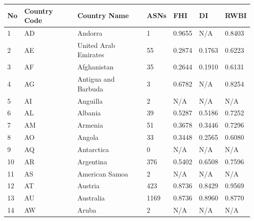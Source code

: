 \documentclass{article}
\begin{document}
\begin{table}
\centering
\caption{Number of ASes and the normalized indexes: Freedom House Index, Democracy Index and Reporters Without Borders Index)}
\label{tab:data}
\begin{longtable}{|l|l|l|l|l|l|l|}
\hline
No  & Country Code & Country Name                                         & ASNs  & FHI    & DI     & RWBI   \\ \hline
1   & AD           & Andorra                                              & 1     & 0.9655 & N/A    & 0.8403 \\ \hline
2   & AE           & United Arab Emirates                                 & 55    & 0.2874 & 0.1763 & 0.6223 \\ \hline
3   & AF           & Afghanistan                                          & 35    & 0.2644 & 0.1910 & 0.6131 \\ \hline
4   & AG           & Antigua and Barbuda                                  & 3     & 0.6782 & N/A    & 0.8254 \\ \hline
5   & AI           & Anguilla                                             & 2     & N/A    & N/A    & N/A    \\ \hline
6   & AL           & Albania                                              & 39    & 0.5287 & 0.5186 & 0.7252 \\ \hline
7   & AM           & Armenia                                              & 51    & 0.3678 & 0.3446 & 0.7296 \\ \hline
8   & AO           & Angola                                               & 33    & 0.3448 & 0.2565 & 0.6080 \\ \hline
9   & AQ           & Antarctica                                           & 0     & N/A    & N/A    & N/A    \\ \hline
10  & AR           & Argentina                                            & 376   & 0.5402 & 0.6508 & 0.7596 \\ \hline
11  & AS           & American Samoa                                       & 2     & N/A    & N/A    & N/A    \\ \hline
12  & AT           & Austria                                              & 423   & 0.8736 & 0.8429 & 0.9569 \\ \hline
13  & AU           & Australia                                            & 1169  & 0.8736 & 0.8960 & 0.8770 \\ \hline
14  & AW           & Aruba                                                & 2     & N/A    & N/A    & N/A    \\ \hline

\end{longtable}
\end{table}
\end{document}
